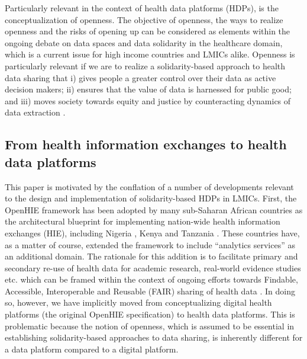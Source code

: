 \documentclass[
  authoryear]{elsarticle}
\begin{document}
Particularly relevant in the context of health data platforms (HDPs), is
the conceptualization of openness. The objective of openness, the ways
to realize openness and the risks of opening up can be considered as
elements within the ongoing debate on data spaces
\citep{otto2022designing} and data solidarity
\citep{kickbusch2021lancet, prainsack2022data, prainsack2023beyond} in
the healthcare domain, which is a current issue for high income
countries and LMICs alike. Openness is particularly relevant if we are
to realize a solidarity-based approach to health data sharing that i)
gives people a greater control over their data as active decision
makers; ii) ensures that the value of data is harnessed for public good;
and iii) moves society towards equity and justice by counteracting
dynamics of data extraction \citep{prainsack2022data}.

\subsection{From health information exchanges to health data
platforms}\label{from-health-information-exchanges-to-health-data-platforms}

This paper is motivated by the conflation of a number of developments
relevant to the design and implementation of solidarity-based HDPs in
LMICs. First, the OpenHIE framework \citep{openhie} has been adopted by
many sub-Saharan African countries \citep{mamuye2022health} as the
architectural blueprint for implementing nation-wide health information
exchanges (HIE), including Nigeria \citep{ohienigeria}, Kenya
\citep{khisif} and Tanzania \citep{tzhea2020}. These countries have, as
a matter of course, extended the framework to include ``analytics
services'' as an additional domain. The rationale for this addition is
to facilitate primary and secondary re-use of health data for academic
research, real-world evidence studies etc. which can be framed within
the context of ongoing efforts towards Findable, Accessible,
Interoperable and Reusable (FAIR) sharing of health data
\citep{guillot2023fair}. In doing so, however, we have implicitly moved
from conceptualizing digital health platforms (the original OpenHIE
specification) to health data platforms. This is problematic because the
notion of openness, which is assumed to be essential in establishing
solidarity-based approaches to data sharing, is inherently different for
a data platform compared to a digital platform.
\end{document}
